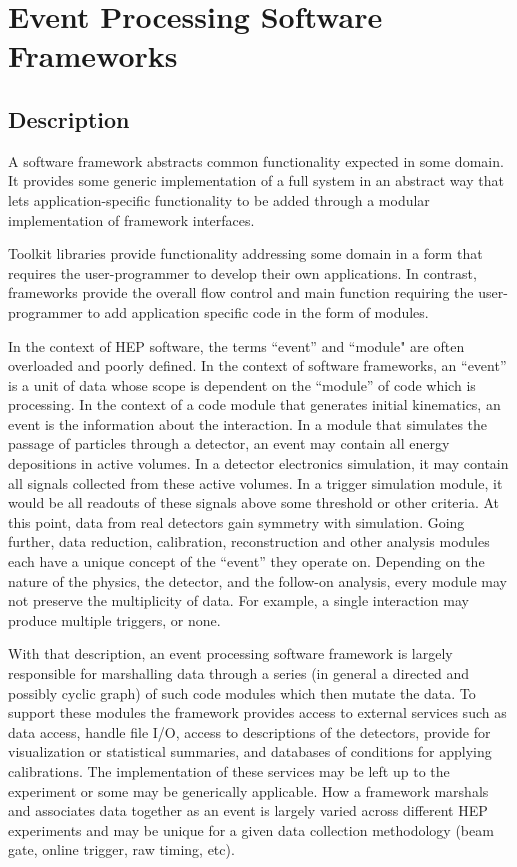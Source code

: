 \section{Event Processing Software Frameworks}

\subsection{Description}

A software framework abstracts common functionality expected in some
domain.  It provides some generic implementation of a full system in
an abstract way that lets application-specific functionality to be
added through a modular implementation of framework interfaces.

Toolkit libraries provide functionality addressing some domain in a
form that requires the user-programmer to develop their own
applications.  In contrast, frameworks provide the overall flow
control and main function requiring the user-programmer to add
application specific code in the form of modules.

In the context of HEP software, the terms ``event'' and ``module" are often overloaded and poorly defined.
In the context of software frameworks, an ``event'' is a unit of data whose scope is dependent
on the ``module'' of code which is processing.  In the context of a
code module that generates initial kinematics, an event is the
information about the interaction.  In a module that simulates the
passage of particles through a detector, an event may contain all
energy depositions in active volumes.  In a detector electronics
simulation, it may contain all signals collected from these active
volumes.  In a trigger simulation module, it would be all readouts of
these signals above some threshold or other criteria.  At this point,
data from real detectors gain symmetry with simulation.  Going further,
data reduction, calibration, reconstruction and other analysis modules
each have a unique concept of the ``event'' they operate on.
Depending on the nature of the physics, the detector, and the follow-on
analysis, every module may not preserve the multiplicity of data.  For
example, a single interaction may produce multiple triggers, or none.

With that description, an event processing software framework is
largely responsible for marshalling data through a series (in general a
directed and possibly cyclic graph) of such code modules which then mutate the data.  To support
these modules the framework provides access to external services such
as data access, handle file I/O, access
to descriptions of the detectors, provide for visualization or
statistical summaries, and databases of conditions for applying
calibrations. 
%
The implementation of these services may be left up to the experiment
or some may be generically applicable.
%
How a framework marshals and associates data together as an event is
largely varied across different HEP experiments and may be unique for
a given data collection methodology (beam gate, online trigger, raw
timing, etc).


